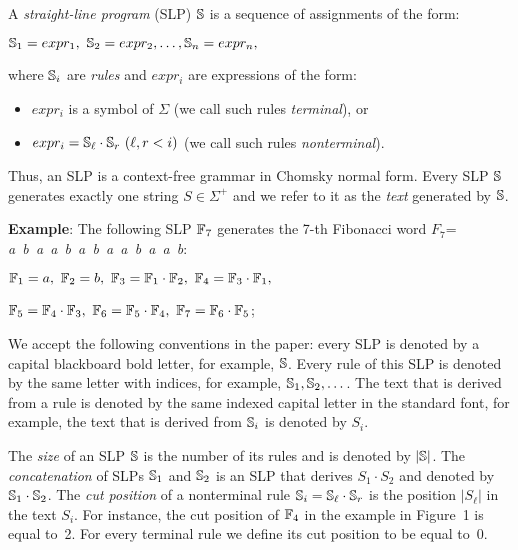﻿\documentclass[11pt]{article}
\begin{document}
A \emph{straight-line program} (SLP) $\mathbb{S}$ is a sequence of assignments of the form:

\begin{center}
$\mathbb{S}_1 = expr_1,\ \mathbb{S}_2 = expr_2, \dots, \mathbb{S}_n = expr_n,$
\end{center}
where $\mathbb{S}_i$ are \emph{rules} and $expr_i$ are expressions of the form:
\begin{itemize}
\item $expr_i$ is a symbol of $\Sigma$ (we call such rules \emph{terminal}), or
\item $expr_i = \slp{S}_\ell\cdot \slp{S}_r \ (\ell, r < i)$ (we call such rules \emph{nonterminal}).
\end{itemize}

Thus, an SLP is a context-free grammar in Chomsky normal form. Every SLP $\mathbb{S}$ generates exactly one string
$S\in\Sigma^+$ and we refer to it as the \emph{text} generated by $\mathbb{S}$.

{\bf Example}: The following SLP $\mathbb{F}_7$ generates the 7-th Fibonacci word $F_7$= \emph{a~b~a~a~b~a~b~a~a~b~a~a~b}:
\begin{center}
$\mathbb{F}_1 = a,\ \mathbb{F}_2 = b,\ \mathbb{F}_3 = \mathbb{F}_1\cdot \mathbb{F}_2,\ \mathbb{F}_4 = \mathbb{F}_3\cdot \mathbb{F}_1,$

$\slp{F}_5 = \slp{F}_4\cdot \slp{F}_3,\ \slp{F}_6 = \slp{F}_5\cdot \slp{F}_4,\ \slp{F}_7 = \slp{F}_6\cdot
\slp{F}_5$;
\end{center}

We accept the following conventions in the paper: every SLP is denoted by a capital blackboard bold letter, for
example, $\mathbb{S}$. Every rule of this SLP is denoted by the same letter with indices, for example,
$\mathbb{S}_1,\mathbb{S}_2,\dots$. The text that is derived from a rule is denoted by the same indexed capital letter in
the standard font, for example, the text that is derived from $\mathbb{S}_i$ is denoted by $S_i$. 

The \emph{size} of an SLP $\mathbb{S}$ is the number of its rules and is denoted by $|\mathbb{S}|$. The \emph{concatenation}
of SLPs $\mathbb{S}_1$ and $\mathbb{S}_2$ is an SLP that derives $S_1 \cdot S_2$ and denoted by $\mathbb{S}_1 \cdot \mathbb{S}_2$. 
The \emph{cut position} of a nonterminal rule $\mathbb{S}_i = \mathbb{S}_\ell\cdot \mathbb{S}_r$ is the position $|S_\ell|$ in
the text $S_i$. For instance, the cut position of $\mathbb{F}_4$ in the example in Figure~1 is equal to~2. For every
terminal rule we define its cut position to be equal to~0.
\end{document}
